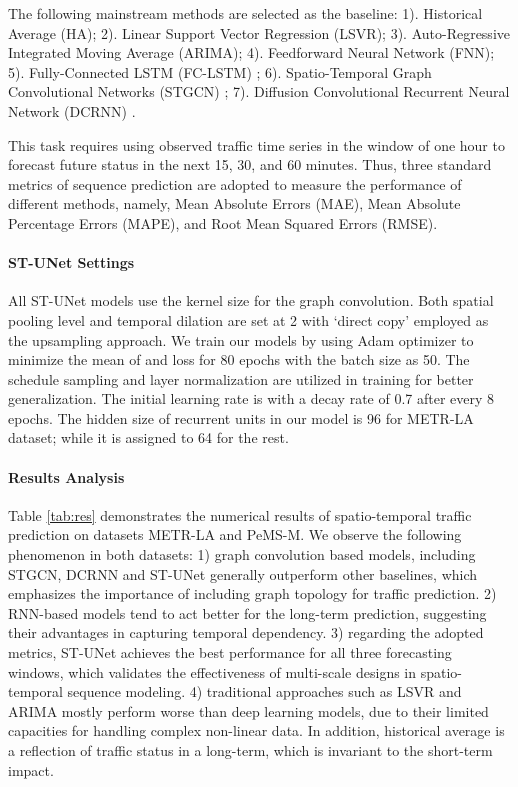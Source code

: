 \documentclass[sigconf,screen]{acmart}
\begin{document}
The following mainstream methods are selected as the baseline: 1). Historical Average (HA); 2). Linear Support Vector Regression (LSVR); 3). Auto-Regressive Integrated Moving Average (ARIMA); 4). Feedforward Neural Network (FNN); 5). Fully-Connected LSTM (FC-LSTM) \cite{sutskever2014sequence}; 6). Spatio-Temporal Graph Convolutional Networks (STGCN) \cite{yu2018spatio}; 7). Diffusion Convolutional Recurrent Neural Network (DCRNN) \cite{li2018dcrnn_traffic}.

This task requires using observed traffic time series in the window of one hour to forecast future status in the next 15, 30, and 60 minutes. Thus, three standard metrics of sequence prediction are adopted to measure the performance of different methods, namely, Mean Absolute Errors (MAE), Mean Absolute Percentage Errors (MAPE), and Root Mean Squared Errors (RMSE).

\paragraph{ST-UNet Settings}
All ST-UNet models use the kernel size  for the graph convolution. Both spatial pooling level  and temporal dilation  are set at 2 with `direct copy' employed as the upsampling approach. We train our models by using Adam optimizer to minimize the mean of  and  loss for 80 epochs with the batch size as 50. The schedule sampling and layer normalization are utilized in training for better generalization. The initial learning rate is  with a decay rate of 0.7 after every 8 epochs. The hidden size of recurrent units in our model is 96 for METR-LA dataset; while it is assigned to 64 for the rest.

\paragraph{Results Analysis}
Table \ref{tab:res} demonstrates the numerical results of spatio-temporal traffic prediction on datasets METR-LA and PeMS-M. We observe the following phenomenon in both datasets: 1) graph convolution based models, including STGCN, DCRNN and ST-UNet generally outperform other baselines, which emphasizes the importance of including graph topology for traffic prediction. 2) RNN-based models tend to act better for the long-term prediction, suggesting their advantages in capturing temporal dependency. 3) regarding the adopted metrics, ST-UNet achieves the best performance for all three forecasting windows, which validates the effectiveness of multi-scale designs in spatio-temporal sequence modeling. 4) traditional approaches such as LSVR and ARIMA mostly perform worse than deep learning models, due to their limited capacities for handling complex non-linear data. In addition, historical average is a reflection of traffic status in a long-term, which is invariant to the short-term impact. 
\end{document}

